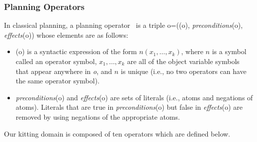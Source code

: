 \subsubsection{Planning Operators}
 In classical planning, a planning operator~\cite{NAU.2004} is a triple o=((o), \textit{preconditions}(o), \textit{effects}(o)) whose elements are as follows:
\begin{itemize}
\item {}(o) is a syntactic expression of the form $n(x_1,\dots,x_k)$, where $n$ is a symbol
called an operator symbol, $x_1,\dots,x_k$ are all of the object variable symbols that
appear anywhere in \textit{o}, and $n$ is unique (i.e., no two operators can have the
same operator symbol).
\item \textit{preconditions}(o) and \textit{effects}(o) are sets of literals (i.e., atoms and negations of atoms). Literals that are true in \textit{preconditions}(o) but false in \textit{effects}(o) are removed by using negations of the appropriate atoms.
\end{itemize}

Our kitting domain is composed of ten operators which are defined below.


